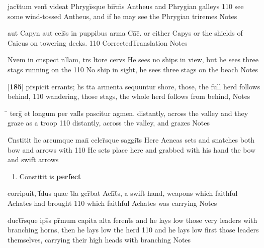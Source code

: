 \latline
  {jact\={}tum vent\={} videat Phrygi\={}sque bir\={}m\={\macron {\i}}s}
  { Antheus and Phrygian galleys }
  {110}
  { see some wind-tossed Antheus, and if he may see the Phrygian triremes }
  { Notes }


\latline
  {aut Capyn aut cels\={\macron {\i}}s in puppibus arma Ca\={\macron {\i}}c\={\macron {\i}}.}
  { or either Capys or the shields of Caicus on towering decks. }
  {110}
  { CorrectedTranslation }
  { Notes }



\latline
  {N\={}vem in c\={}nspect\={} n\={}llam, tr\={\macron {\i}}s l\={\macron {\i}}tore cerv\={}s}
  { He sees no ships in view, but he sees three stags running on the  }
  {110}
  { No ship in sight, he sees three stags on the beach }
  { Notes }


\latline
  {[\textbf{185}] pr\={}spicit errant\={\macron {\i}}s; h\={}s t\={}ta armenta sequuntur}
  { shore, those, the full herd follows behind, }
  {110}
  { wandering, those stags, the whole herd follows from behind,  }
  { Notes }


\latline
  {\={} terg\={} et longum per vall\={\macron {\i}}s pascitur agmen.}
  { distantly, across the valley and they graze as a troop }
  {110}
  { distantly, across the valley, and grazes }
  { Notes }



\latline
  {C\={}nstitit h\={\macron {\i}}c arcumque man\={} celer\={\macron {\i}}sque saggit\={}s}
  { Here Aeneas sets and snatches both bow and arrows with }
  {110}
  { He sets place here and grabbed with his hand the bow and swift arrows  }
  { \begin{enumerate}
  	\item C\={o}nstitit is \textbf{perfect}
  \end{enumerate} }


\latline
  {corripuit, f\={\macron {\i}}dus quae t\={}la ger\={}bat Ach\={}t\={}s,}
  { a swift hand, weapons which faithful Achates had brought  }
  {110}
  { which faithful Achates was carrying }
  { Notes }


\latline
  {duct\={}r\={}sque ips\={}s pr\={\macron {\i}}mum capita alta ferent\={\macron {\i}}s}
  { and he lays low those very leaders with branching horns, then he lays low the herd  }
  {110}
  { and he lays low first those leaders themselves, carrying their high heads with branching  }
  { Notes }



